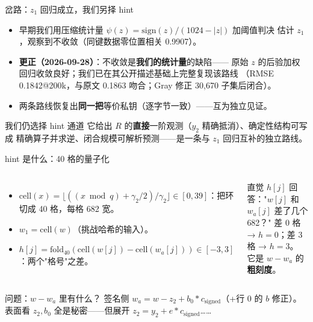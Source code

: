 \documentclass[11pt,aspectratio=169]{ctexbeamer}
\begin{document}
\begin{frame}{岔路：$z_1$ 回归成立，我们另择 hint}
  \begin{itemize}
    \item 早期我们用压缩统计量 $\psi(z)=\mathrm{sign}(z)/(1024-|z|)$ 加阈值判决
          估计 $z_1$，观察到不收敛（同键数据零位置相关 0.9907）。
    \item \textbf{更正（2026-09-28）}：不收敛是\textbf{我们的统计量}的缺陷——
          原始 $z$ 的后验加权回归收敛良好；我们已在其公开描述基础上完整复现该路线
          （RMSE 0.1842@200k，与原文 0.1863 吻合；Gray 修正 30,670 子集后闭合）。
    \item 两条路线恢复出\textbf{同一把}等价私钥（逐字节一致）——互为独立见证。
  \end{itemize}
  \begin{block}{我们仍选择 hint 通道}
    \small 它给出 $R$ 的\textbf{直接}一阶观测（$y_2$ 精确抵消）、确定性结构可写成
    精确算子并求逆、闭合规模可解析预测——是一条与 $z_1$ 回归互补的独立路线。
  \end{block}
\end{frame}

\begin{frame}{hint 是什么：40 格的量子化}
  \begin{columns}[T]
    \begin{itemize}
      \item $\mathrm{cell}(x) = \lfloor ((x \bmod q)+\gamma_2/2)/\gamma_2\rfloor
            \in [0,39]$：把环切成 40 格，每格 682 宽。
      \item $w_1 = \mathrm{cell}(w)$（挑战哈希的输入）。
      \item $h[j] = \mathrm{fold}_{40}(\mathrm{cell}(w[j]) -
            \mathrm{cell}(w_a[j])) \in [-3,3]$：两个"格号"之差。
    \end{itemize}
    \begin{exampleblock}{直觉}
      \small $h[j]$ 回答："$w[j]$ 和 $w_a[j]$ 差了几个 682？"
      差 0 格 → $h=0$；差 3 格 → $h=3$。\\[0.3em]
      它是 $w-w_a$ 的\textbf{粗刻度}。
    \end{exampleblock}
  \end{columns}
  \vspace{0.2em}
  \begin{block}{问题：$w - w_a$ 里有什么？}
    \small 签名侧 $w_a = w - z_2 + b_0*c_{\mathrm{signed}}$（+行 0 的 $b$ 修正）。
    表面看 $z_2, b_0$ 全是秘密——但展开 $z_2 = y_2 + e*c_{\mathrm{signed}}$……
  \end{block}
\end{frame}
\end{document}
